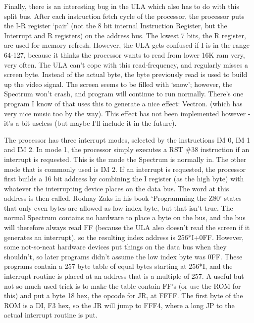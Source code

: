     Finally, there is an interesting bug in the ULA which also has to do
    with this split bus.  After each instruction fetch cycle of the
    processor, the processor puts the I-R register `pair' (not the 8 bit
    internal Instruction Register, but the Interrupt and R registers) on the
    address bus.  The lowest 7 bits, the R register, are used for memory
    refresh.  However, the ULA gets confused if I is in the range 64-127,
    because it thinks the processor wants to read from lower 16K ram very,
    very often.  The ULA can't cope with this read-frequency, and regularly
    misses a screen byte.  Instead of the actual byte, the byte previously
    read is used to build up the video signal.  The screen seems to be
    filled with `snow'; however, the Spectrum won't crash, and program will
    continue to run normally.  There's one program I know of that uses this
    to generate a nice effect: Vectron.  (which has very nice music too by
    the way).  This effect has not been implemented however - it's a bit
    useless (but maybe I'll include it in the future).

    The processor has three interrupt modes, selected by the instructions IM
    0, IM 1 and IM 2.  In mode 1, the processor simply executes a RST \#38
    instruction if an interrupt is requested.  This is the mode the Spectrum
    is normally in.  The other mode that is commonly used is IM 2.  If an
    interrupt is requested, the processor first builds a 16 bit address by
    combining the I register (as the high byte) with whatever the
    interrupting device places on the data bus.  The word at this address is
    then called.  Rodnay Zaks in his book `Programming the Z80' states that
    only even bytes are allowed as low index byte, but that isn't true.  The
    normal Spectrum contains no hardware to place a byte on the bus, and the
    bus will therefore always read FF (because the ULA also doesn't read the
    screen if it generates an interrupt), so the resulting index address is
    256*I+0FF\@.  However, some not-so-neat hardware devices put things on the
    data bus when they shouldn't, so later programs didn't assume the low
    index byte was 0FF\@.  These programs contain a 257 byte table of equal
    bytes starting at 256*I, and the interrupt routine is placed at an
    address that is a multiple of 257.  A useful but not so much used trick
    is to make the table contain FF's (or use the ROM for this) and put a
    byte 18 hex, the opcode for JR, at FFFF\@.  The first byte of the ROM is a
    DI, F3 hex, so the JR will jump to FFF4, where a long JP to the actual
    interrupt routine is put.

